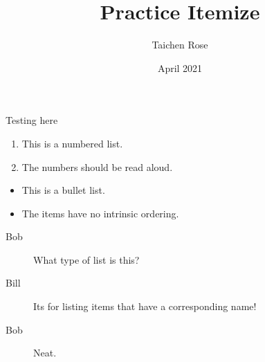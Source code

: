 \documentclass{article}
\title{Practice Itemize}
\author{Taichen Rose}
\date{April 2021}
\begin{document}
Testing here

\begin{enumerate}
    \item This is a numbered list.
    \item The numbers should be read aloud.
\end{enumerate}

\begin{itemize}
    \item This is a bullet list.
    \item The items have no intrinsic ordering.
\end{itemize}

\begin{description}
    \item[Bob] What type of list is this?
    \item[Bill] Its for listing items that have a corresponding name!
    \item[Bob] Neat.
\end{description}
\end{document}
